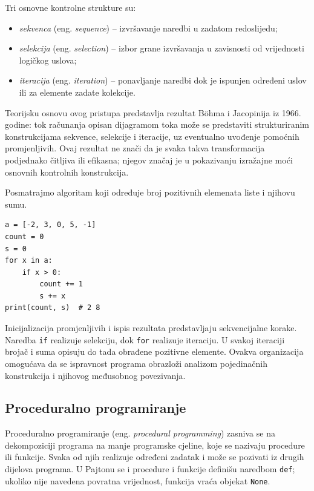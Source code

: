 Tri osnovne kontrolne strukture su:
\begin{itemize}
\item \textit{sekvenca} (eng. \textit{sequence}) -- izvršavanje naredbi u zadatom redoslijedu;
\item \textit{selekcija} (eng. \textit{selection}) -- izbor grane izvršavanja u zavisnosti od vrijednosti logičkog uslova;
\item \textit{iteracija} (eng. \textit{iteration}) -- ponavljanje naredbi dok je ispunjen određeni uslov ili za elemente zadate kolekcije.
\end{itemize}

Teorijsku osnovu ovog pristupa predstavlja rezultat B\"ohma i Jacopinija iz 1966. godine: tok računanja opisan dijagramom toka može se predstaviti strukturiranim konstrukcijama sekvence, selekcije i iteracije, uz eventualno uvođenje pomoćnih promjenljivih. Ovaj rezultat ne znači da je svaka takva transformacija podjednako čitljiva ili efikasna; njegov značaj je u pokazivanju izražajne moći osnovnih kontrolnih konstrukcija.

Posmatrajmo algoritam koji određuje broj pozitivnih elemenata liste i njihovu sumu.
\begin{verbatim}
a = [-2, 3, 0, 5, -1]
count = 0
s = 0
for x in a:
    if x > 0:
        count += 1
        s += x
print(count, s)  # 2 8
\end{verbatim}

Inicijalizacija promjenljivih i ispis rezultata predstavljaju sekvencijalne korake. Naredba \texttt{if} realizuje selekciju, dok \texttt{for} realizuje iteraciju. U svakoj iteraciji brojač i suma opisuju do tada obrađene pozitivne elemente. Ovakva organizacija omogućava da se ispravnost programa obrazloži analizom pojedinačnih konstrukcija i njihovog međusobnog povezivanja.

\subsection{Proceduralno programiranje}

Proceduralno programiranje (eng. \textit{procedural programming}) zasniva se na dekompoziciji programa na manje programske cjeline, koje se nazivaju procedure ili funkcije. Svaka od njih realizuje određeni zadatak i može se pozivati iz drugih dijelova programa. U Pajtonu se i procedure i funkcije definišu naredbom \texttt{def}; ukoliko nije navedena povratna vrijednost, funkcija vraća objekat \texttt{None}.


